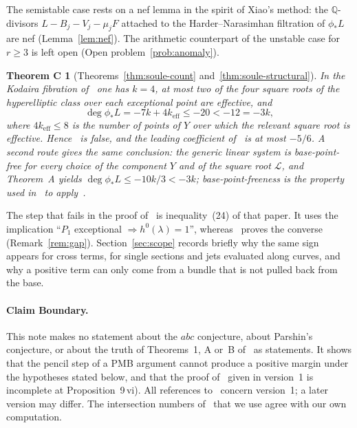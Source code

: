 \documentclass[11pt]{article}
\newtheorem*{theoremC}{Theorem C}
\theoremstyle{definition}
\theoremstyle{remark}
\newcommand{\cL}{\mathcal{L}}
\begin{document}
The semistable case rests on a nef lemma in the spirit of Xiao's method: the
$\mathbb{Q}$-divisors $L-B_j-V_j-\mu_jF$ attached to the Harder--Narasimhan
filtration of $\phi_*L$ are nef (Lemma~\ref{lem:nef}). The arithmetic counterpart
of the unstable case for $r\ge 3$ is left open (Open problem~\ref{prob:anomaly}).

\begin{theoremC}[Theorems~\ref{thm:soule-count} and~\ref{thm:soule-structural}]
In the Kodaira fibration of~\cite{So26} one has $k=4$, at most two of the four
square roots of the hyperelliptic class over each exceptional point are
effective, and
\[
\deg\phi_*L=-7k+4k_{\mathrm{eff}}\le -20<-12=-3k ,
\]
where $4k_{\mathrm{eff}}\le 8$ is the number of points of $Y$ over which the
relevant square root is effective. Hence~\cite[Prop.~9\,vi)]{So26} is false, and
the leading coefficient of~\cite[(36)]{So26} is at most $-5/6$. A second route
gives the same conclusion: the generic linear system is base-point-free for every
choice of the component $Y$ and of the square root $\cL$, and Theorem~A yields
$\deg\phi_*L\le -10k/3<-3k$; base-point-freeness is the property used
in~\cite[(28)]{So26} to apply~\cite[Prop.~3]{So26}.
\end{theoremC}

The step that fails in the proof of~\cite[Prop.~9]{So26} is inequality~(24) of
that paper. It uses the implication ``$P_1$ exceptional $\Rightarrow
h^0(\lambda)=1$'', whereas~\cite[Prop.~5\,ii)]{So26} proves the converse
(Remark~\ref{rem:gap}). Section~\ref{sec:scope} records briefly why the same sign
appears for cross terms, for single sections and jets evaluated along curves, and
why a positive term can only come from a bundle that is not pulled back from the
base.

\paragraph{Claim Boundary.}
This note makes no statement about the $abc$ conjecture, about Parshin's
conjecture, or about the truth of Theorems~1, A or~B of~\cite{So26} as statements.
It shows that the pencil step of a PMB argument cannot produce a positive margin
under the hypotheses stated below, and that the proof of~\cite[Theorem~1]{So26}
given in version~1 is incomplete at Proposition~9\,vi). All references
to~\cite{So26} concern version~1; a later version may differ. The intersection
numbers of~\cite[Prop.~8 and Prop.~9\,ii), iii)]{So26} that we use agree with our
own computation.
\end{document}
